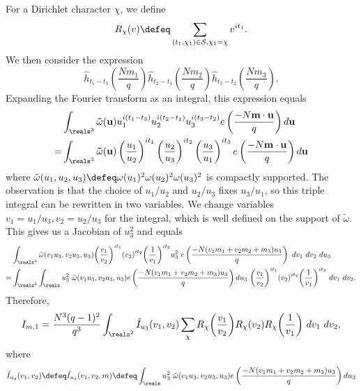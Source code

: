 For a Dirichlet character $\chi$, we define \[
R_\chi (v) \defeq\sum_{(t_1,\chi_1)\in \mathcal{S}, \chi_1=\chi} v^{it_1}.
\]
We then consider the expression \[
	\hat{h}_{t_1-t_3}\left(\frac{Nm_1}{q}\right)\hat{h}_{t_2-t_1}\left(\frac{Nm_2}{q}\right)\hat{h}_{t_3-t_2}\left(\frac{Nm_3}{q}\right).
\]
Expanding the Fourier transform as an integral, this expression equals \begin{align*}
	 &\int_{\reals^3}\mathbf{\tilde{\omega}}(\mathbf{u})u_1^{i(t_1-t_3)}u_2^{i(t_2-t_1)}u_3^{i(t_3-t_2)}e\left(\frac{-N\mathbf{m}\cdot \mathbf{u}}{q}\right)d\mathbf{u}\\
	 =&\int_{\reals^3}\mathbf{\tilde{\omega}}(\mathbf{u})\left(\frac{u_1}{u_2}\right)^{it_1}\left(\frac{u_2}{u_3}\right)^{it_2}\left(\frac{u_3}{u_1}\right)^{it_3}
	 e\left(\frac{-N\mathbf{m}\cdot \mathbf{u}}{q}\right)d\mathbf{u}
	 \end{align*}
	 where $\tilde{\omega}(u_1,u_2,u_3)\defeq \omega(u_1)^2\omega(u_2)^2\omega(u_3)^2$ is compactly supported. The observation is that the choice of $u_1/u_2$ and $u_2/u_3$ fixes $u_3/u_1$, so this triple integral can be rewritten in two variables. We change variables $v_1=u_1/u_3,v_2=u_2/u_3$ for the integral, which is well defined on the support of $\tilde{\omega}$. This gives us a Jacobian of $u_3^2$ and equals
	 \begin{equation}\label{im1integral}
        \begin{split}
	&\int_{\reals^3}\tilde{\omega}(v_1u_3,v_2u_3,u_3) {\left(\frac{v_1}{v_2}\right)}^{it_1} {\left(v_2\right)}^{it_2}{\left(\frac{1}{v_1}\right)}^{it_3} u_3^2 \ e\left(\frac{-N(v_1m_1+v_2m_2+m_3)u_3}{q}\right)\ dv_1\ dv_2\ du_3\\
	=&\int_{\reals^2}\int_\reals u_3^2 \ \tilde{\omega}(v_1u_3,v_2u_3,u_3) e\left(\frac{-N(v_1m_1+v_2m_2+m_3)u_3}{q}\right)  du_3 \ {\left(\frac{v_1}{v_2}\right)}^{it_1} {\left(v_2\right)}^{it_2}{\left(\frac{1}{v_1}\right)}^{it_3}  \ dv_1\ dv_2.\\
     \end{split}
\end{equation}
Therefore, \begin{equation*}
    I_{m,1} = \frac{N^3(q-1)^2}{q^3}\int_{\reals^2} \tilde{I}_{u_3}(v_1,v_2) \sum_{\chi} R_{\chi}{\left(\frac{v_1}{v_2}\right)}R_{\chi} {\left(v_2\right)}R_{\chi}{\left(\frac{1}{v_1}\right)} \ dv_1\ dv_2,
\end{equation*}
    where\[
     \tilde{I}_{u_3}(v_1,v_2)\defeq \tilde{I}_{u_3}(v_1,v_2,m)\defeq \int_\reals u_3^2 \ \tilde{\omega}(v_1u_3,v_2u_3,u_3) e\left(\frac{-N(v_1m_1+v_2m_2+m_3)u_3}{q}\right)  du_3\]
